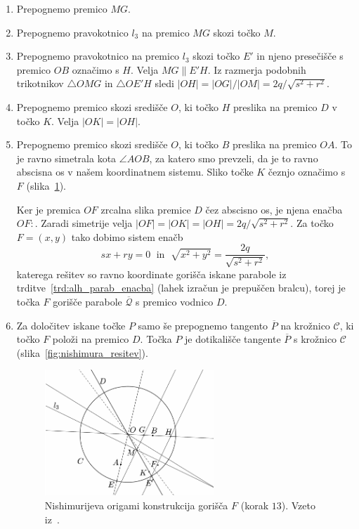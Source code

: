 \begin{enumerate}
\begin{figure}[h]
    \end{figure}
    \item Prepognemo premico $MG$.
    \item Prepognemo pravokotnico $l_3$ na premico $MG$ skozi točko $M$.
    \item Prepognemo pravokotnico na premico $l_3$ skozi točko $E'$ in njeno presečišče s premico $OB$ označimo s $H$. Velja $MG \parallel E'H$. Iz razmerja podobnih trikotnikov $\triangle OMG$ in $\triangle OE'H$ sledi $|OH|= |OG|/|OM| = 2q/ \sqrt{s^2+r^2}$.
    \item Prepognemo premico skozi središče $O$, ki točko $H$ preslika na premico $D$ v točko $K$. Velja $|OK| = |OH|$.
    \item Prepognemo premico skozi središče $O$, ki točko $B$ preslika na premico $OA$. To je ravno simetrala kota $\angle AOB$, za katero smo prevzeli, da je to ravno abscisna os v našem koordinatnem sistemu. Sliko točke $K$ čeznjo označimo s $F$ (slika~\ref{fig:nishimura_origami2}).
    
    Ker je premica $OF$ zrcalna slika premice $D$ čez abscisno os, je njena enačba $OF: $. Zaradi simetrije velja $|OF| = |OK| = |OH| = 2q/ \sqrt{s^2+r^2}$. Za točko $F = (x,y)$ tako dobimo sistem enačb
    $$ sx+ry=0 \; \text{ in } \; \sqrt{x^2+y^2} = \frac{2q}{\sqrt{s^2+r^2}},$$
    katerega rešitev so ravno koordinate gorišča iskane parabole iz trditve~\ref{trd:alh_parab_enacba} (lahek izračun je prepuščen bralcu), torej je točka $F$ gorišče parabole $\mathcal{\overline{Q}}$ s premico vodnico $D$.
    
    \item Za določitev iskane točke $P$ samo še prepognemo tangento $\overline{P}$ na krožnico $\mathcal{C}$, ki točko $F$ položi na premico $D$. Točka $P$ je dotikališče tangente $\overline{P}$ s krožnico $\mathcal{C}$ (slika~\ref{fig:nishimura_resitev}).
    \begin{figure}[h]
        \centering
        \includegraphics[width=0.6\textwidth]{images/alhazen/nishimura_origami2.png}
        \caption[Nishimurijeva konstrukcija $2$]{Nishimurijeva origami konstrukcija gorišča $F$ (korak $13$). Vzeto iz~\cite[str.\ 42]{nishimura2018}.}
        \label{fig:nishimura_origami2}
    \end{figure}
\end{enumerate}


